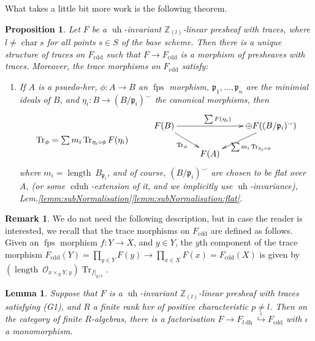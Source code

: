 \documentclass[10pt]{amsart}
\newtheorem{prop}[theo]{Proposition}
\newtheorem{lemm}[theo]{Lemma}
\theoremstyle{definition}
\newtheorem{rema}[theo]{Remark}
\newcommand{\OO}{\mathcal{O}}
\newcommand{\p}{\mathfrak{p}}
\newcommand{\zll}{\mathbb{Z}_{(l)}}
\DeclareMathOperator{\Tr}{Tr}
\newcommand{\fps}{{\operatorname{fps}}}
\newcommand{\ldh}{{l{\operatorname{dh}}}}
\newcommand{\uh}{\operatorname{uh}}
\newcommand{\cduh}{\operatorname{cduh}}
\newcommand{\length}{{\operatorname{length}}}
\newcommand{\cdd}{{\operatorname{cdd}}}
\begin{document}
What takes a little bit more work is the following theorem.

\begin{prop} \label{prop:cddTraces} {\cite[Thm.3.5.5, Lem.3.3.6(2), Def.3.3.4, Prop.3.5.7]{Kel12}}
Let $F$ be a $\uh$-invariant $\zll$-linear presheaf with traces, where $l \neq \operatorname{char}s$ for all points $s \in S$ of the base scheme. Then there is a unique structure of traces on $F_\cdd$ such that $F \to F_\cdd$ is a morphism of presheaves with traces. Moreover, the trace morphisms on $F_\cdd$ satisfy:

\begin{enumerate}
 \item[(Tr)] If $A$ is a psuedo-hvr, $\phi: A \to B$ an $\fps$ morphism, $\p_1, \dots, \p_n$ are the minimial ideals of $B$, and $\eta_i: B \to (B / \p_i)^\smallsmile$ the canonical morphisms, then 
\[ \xymatrix@R=0pt{
& 
F(B) \ar[rr]^{\sum F(\eta_i)} \ar[ddr]_{\Tr_\phi} && 
\oplus F((B / \p_i)^\smallsmile) \ar[ddl]^{\sum m_i \Tr_{\eta_i \circ \phi}} \\
\Tr_\phi = \sum m_i \Tr_{\eta_i \circ \phi} F(\eta_i) &&& \\
&& 
F(A) & 
} \]
where $m_i = \length\ B_{\p_i}$, and of course, $(B / \p_i)^\smallsmile$ are chosen to be flat over $A$, (or some $\cduh$-extension of it, and we implicitly use $\uh$-invariance), Lem.\ref{lemm:subNormalisation}\eqref{lemm:subNormalisation:flat}.\end{enumerate}
\end{prop}

\begin{rema}
We do not need the following description, but in case the reader is interested, we recall that the trace morphisms on $F_\cdd$ are defined as follows. Given an $\fps$ morphism $f: Y \to X$, and $y \in Y$, the $y$th component of the trace morphism $F_\cdd(Y) = \prod_{y \in Y} F(y) \to \prod_{x \in X} F(x) = F_\cdd(X)$ is given by $(\length\ \OO_{x \times_X Y, y}) \Tr_{f|_{y/x}}$.
\end{rema}

\begin{lemm} \label{lemm:ldhcdd}
Suppose that $F$ is a $\uh$-invariant $\zll$-linear presheaf with traces satisfying (G1), and $R$ a finite rank hvr of positive characteristic $p \neq l$. Then on the category of finite $R$-algebras, there is a factorisation $F \to F_\ldh \stackrel{\iota}{\hookrightarrow} F_\cdd$ with $\iota$ a monomorphism.
\end{lemm}
\end{document}
